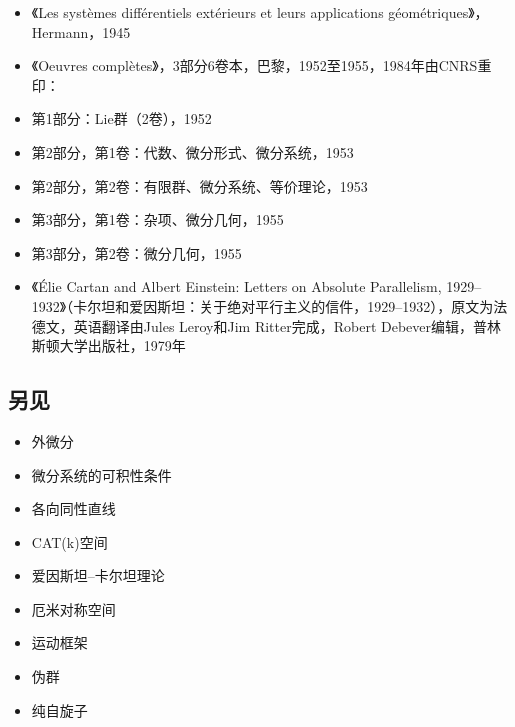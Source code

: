 \begin{itemize}
\item 《Les systèmes différentiels extérieurs et leurs applications géométriques》，Hermann，1945  
\item 《Oeuvres complètes》，3部分6卷本，巴黎，1952至1955，1984年由CNRS重印：  
\item 第1部分：Lie群（2卷），1952  
\item 第2部分，第1卷：代数、微分形式、微分系统，1953  
\item 第2部分，第2卷：有限群、微分系统、等价理论，1953  
\item 第3部分，第1卷：杂项、微分几何，1955  
\item 第3部分，第2卷：微分几何，1955  
\item 《Élie Cartan and Albert Einstein: Letters on Absolute Parallelism, 1929–1932》（卡尔坦和爱因斯坦：关于绝对平行主义的信件，1929–1932），原文为法德文，英语翻译由Jules Leroy和Jim Ritter完成，Robert Debever编辑，普林斯顿大学出版社，1979年
\end{itemize}
\subsection{另见}
\begin{itemize}
\item 外微分  
\item 微分系统的可积性条件  
\item 各向同性直线  
\item CAT(k)空间  
\item 爱因斯坦–卡尔坦理论  
\item 厄米对称空间  
\item 运动框架  
\item 伪群  
\item 纯自旋子
\end{itemize}
